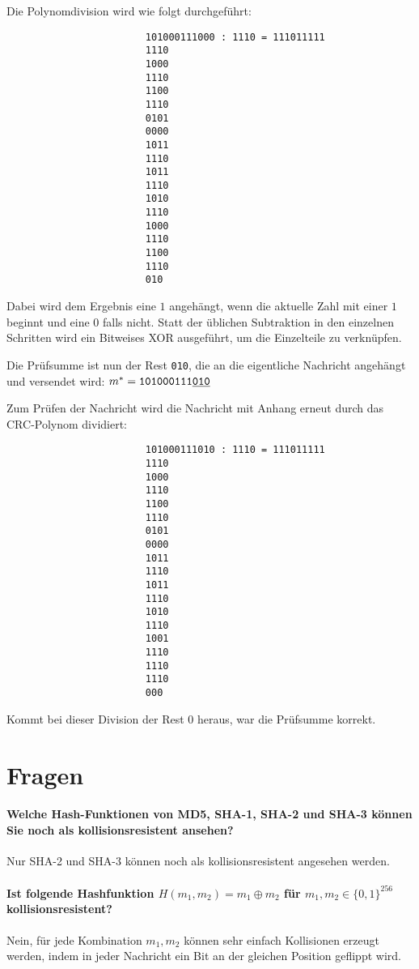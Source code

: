 				Die Polynomdivision wird wie folgt durchgeführt:
				\begin{center}
					\begin{BVerbatim}
						101000111000 : 1110 = 111011111
						1110
						1000
						1110
						1100
						1110
						0101
						0000
						1011
						1110
						1011
						1110
						1010
						1110
						1000
						1110
						1100
						1110
						010
					\end{BVerbatim}
				\end{center}
				Dabei wird dem Ergebnis eine \(1\) angehängt, wenn die aktuelle Zahl mit einer \(1\) beginnt und eine \(0\) falls nicht. Statt der üblichen Subtraktion in den einzelnen Schritten wird ein Bitweises XOR ausgeführt, um die Einzelteile zu verknüpfen.

				Die Prüfsumme ist nun der Rest \texttt{010}, die an die eigentliche Nachricht angehängt und versendet wird: \( m^* = \texttt{101000111\underline{010}} \)

				Zum Prüfen der Nachricht wird die Nachricht mit Anhang erneut durch das CRC-Polynom dividiert:
				\begin{center}
					\begin{BVerbatim}
						101000111010 : 1110 = 111011111
						1110
						1000
						1110
						1100
						1110
						0101
						0000
						1011
						1110
						1011
						1110
						1010
						1110
						1001
						1110
						1110
						1110
						000
					\end{BVerbatim}
				\end{center}
				Kommt bei dieser Division der Rest \(0\) heraus, war die Prüfsumme korrekt.

	\section{Fragen}
		\paragraph{Welche Hash-Funktionen von MD5, SHA-1, SHA-2 und SHA-3 können Sie noch als kollisionsresistent ansehen?}
			Nur SHA-2 und SHA-3 können noch als kollisionsresistent angesehen werden.

		\paragraph{Ist folgende Hashfunktion \( H(m_1, m_2) = m_1 \oplus m_2 \) für \( m_1, m_2 \in \{0, 1\}^{256} \) kollisionsresistent?}
			Nein, für jede Kombination \( m_1, m_2 \) können sehr einfach Kollisionen erzeugt werden, indem in jeder Nachricht ein Bit an der gleichen Position geflippt wird.

